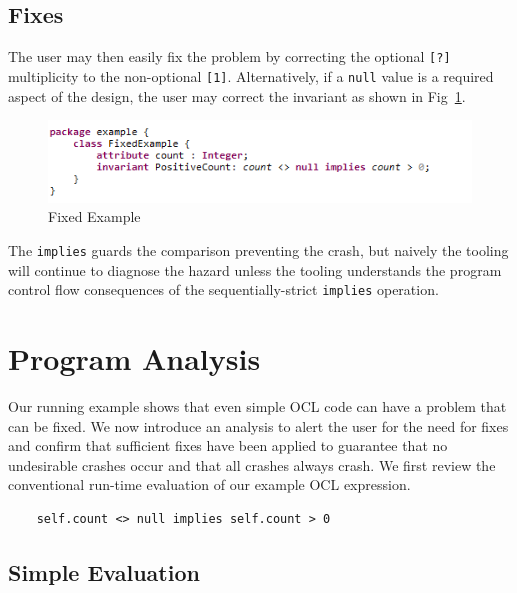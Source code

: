 \documentclass{llncs}
\begin{document}
\subsection{Fixes}

The user may then easily fix the problem by correcting the optional \verb|[?]| multiplicity to the non-optional \verb|[1]|. Alternatively, if a \verb|null| value is a required aspect of the design, the user may correct the invariant as shown in Fig~\ref{fig:FixedExample}.

\begin{figure}
	\vspace{-10pt}
	\begin{center}
		\includegraphics[width=4.5in]{FixedExample.png}
	\end{center}
	\vspace{-10pt}
	\caption{Fixed Example}
	\label{fig:FixedExample}
	\vspace{-10pt}
\end{figure}

The \verb|implies| guards the comparison preventing the crash, but naively the tooling will continue to diagnose the hazard unless the tooling understands the program control flow consequences of the sequentially-strict \verb|implies| operation.

\section{Program Analysis}\label{Program Analysis}

Our running example shows that even simple OCL code can have a problem that can be fixed. We now introduce an analysis to alert the user for the need for fixes and confirm that sufficient fixes have been applied to guarantee that no undesirable crashes occur and that all crashes always crash. We first review the conventional run-time evaluation of our example OCL expression.

\begin{verbatim}
	self.count <> null implies self.count > 0
\end{verbatim}

\subsection{Simple Evaluation}\label{Simple Evaluation}
\end{document}
